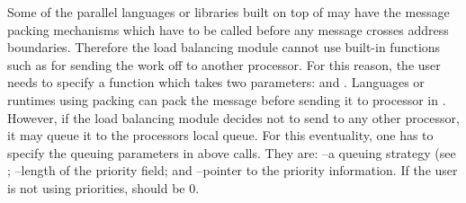 Some of the parallel languages or libraries built on top of \converse{}
may have the message packing mechanisms which have to be called before
any message crosses address boundaries. Therefore the load balancing
module cannot use built-in functions such as 
for sending the work off to another processor. For this reason, the
user needs to specify a function  which takes two
parameters:   and . Languages or
runtimes using packing can pack the message before sending it to
processor  in . However, if the load
balancing module decides not to send  to any other
processor, it may queue it to the processors local queue. For this
eventuality, one has to specify the queuing parameters in above calls.
They are:  --a queuing strategy (see
; --length of the priority
field; and --pointer to the priority information. If the
user is not using priorities,  should be 0.


%
%
%
%


